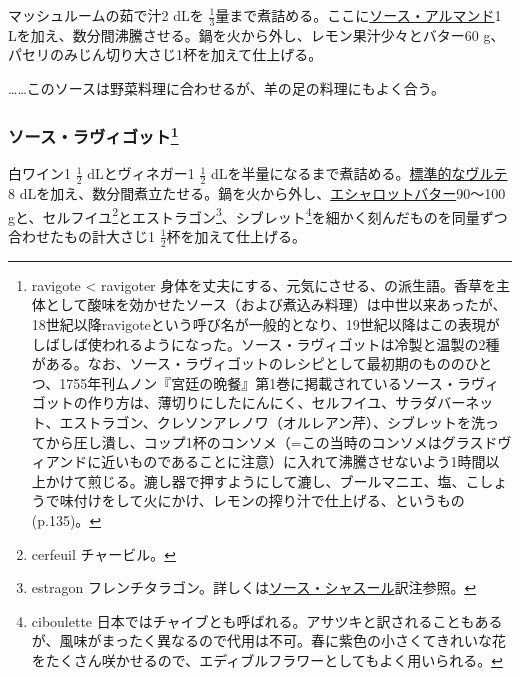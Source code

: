 \begin{recette}

マッシュルームの茹で汁2 dLを
\(\frac{1}{3}\)量まで煮詰める。ここに\protect\hyperlink{sauce-allemande}{ソース・アルマンド}1
Lを加え、数分間沸騰させる。鍋を火から外し、レモン果汁少々とバター60
g、パセリのみじん切り大さじ1杯を加えて仕上げる。

\ldots{}\ldots{}このソースは野菜料理に合わせるが、羊の足の料理にもよく合う。

\hypertarget{sauce-ravigote}{%
\subsubsection[ソース・ラヴィゴット]{\texorpdfstring{ソース・ラヴィゴット\footnote{ravigote
  \textless{} ravigoter
  身体を丈夫にする、元気にさせる、の派生語。香草を主体として酸味を効かせたソース（および煮込み料理）は中世以来あったが、18世紀以降ravigoteという呼び名が一般的となり、19世紀以降はこの表現がしばしば使われるようになった。ソース・ラヴィゴットは冷製と温製の2種がある。なお、ソース・ラヴィゴットのレシピとして最初期のもののひとつ、1755年刊ムノン『宮廷の晩餐』第1巻に掲載されているソース・ラヴィゴットの作り方は、薄切りにしたにんにく、セルフイユ、サラダバーネット、エストラゴン、クレソンアレノワ（オルレアン芹）、シブレットを洗ってから圧し潰し、コップ1杯のコンソメ（=この当時のコンソメはグラスドヴィアンドに近いものであることに注意）に入れて沸騰させないよう1時間以上かけて煎じる。漉し器で押すようにして漉し、ブールマニエ、塩、こしょうで味付けをして火にかけ、レモンの搾り汁で仕上げる、というもの(p.135)。}}{ソース・ラヴィゴット}}\label{sauce-ravigote}}



白ワイン1 \(\frac{1}{2}\) dLとヴィネガー1 \(\frac{1}{2}\)
dLを半量になるまで煮詰める。\protect\hyperlink{veloute}{標準的なヴルテ}8
dLを加え、数分間煮立たせる。鍋を火から外し、\protect\hyperlink{beurre-d-echalote}{エシャロットバター}90〜100
gと、セルフイユ\footnote{cerfeuil チャービル。}とエストラゴン\footnote{estragon
  フレンチタラゴン。詳しくは\protect\hyperlink{sauce-chasseur}{ソース・シャスール}訳注参照。}、シブレット\footnote{ciboulette
  日本ではチャイブとも呼ばれる。アサツキと訳されることもあるが、風味がまったく異なるので代用は不可。春に紫色の小さくてきれいな花をたくさん咲かせるので、エディブルフラワーとしてもよく用いられる。}を細かく刻んだものを同量ずつ合わせたもの計大さじ1
\(\frac{1}{2}\)杯を加えて仕上げる。


\end{recette}
